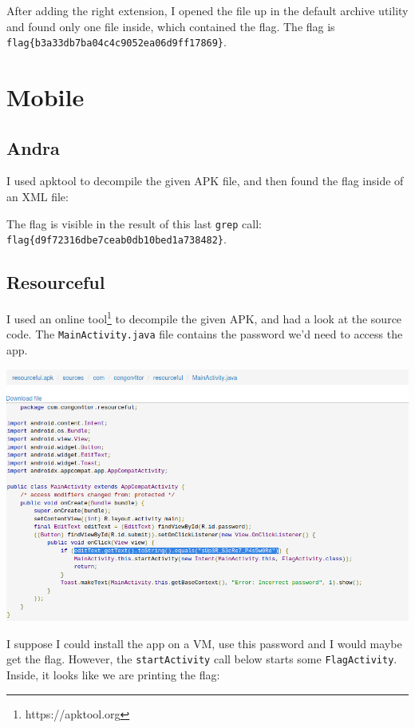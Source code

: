 \documentclass{article}
\begin{document}
\noindent
After adding the right extension, I opened the file up in the default archive utility and found only one file inside, which contained the flag. The flag is \texttt{flag\{b3a33db7ba04c4c9052ea06d9ff17869\}}.

\section{Mobile}
\subsection{Andra}

I used apktool to decompile the given APK file, and then found the flag inside of an XML file:



\noindent
The flag is visible in the result of this last \texttt{grep} call: \texttt{flag\{d9f72316dbe7ceab0db10bed1a738482\}}.

\subsection{Resourceful}

I used an online tool\footnote{https://apktool.org} to decompile the given APK, and had a look at the source code. The \texttt{MainActivity.java} file contains the password we'd need to access the app. 

\begin{center}
    \includegraphics[width=16cm]{resourceful/screenshot1.png}
\end{center}

\noindent
I suppose I could install the app on a VM, use this password and I would maybe get the flag. However, the \texttt{startActivity} call below starts some \texttt{FlagActivity}. Inside, it looks like we are printing the flag:
\end{document}
